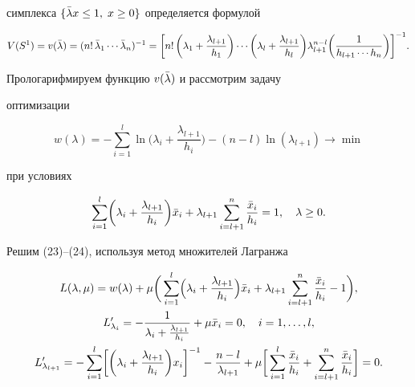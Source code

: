 симплекса $\{\Bar\lambda x\le 1,\;x\ge 0\}$ определяется формулой


$$


V(S^1)=v(\Bar \lambda)=(n!\,\Bar\lambda_1\dotsb


\Bar\lambda_n)^{-1}=\biggl[n!\,\biggl(\lambda_1+


\frac{\lambda_{l+1}}{h_1}\biggr)\dotsb\biggl(\lambda_l+


\frac{\lambda_{l+1}}{h_l}\biggr)\lambda^{n-l}_{l+1}


\biggl(\frac{1}{h_{l+1}\dotsb h_n}\biggr)\biggr]^{-1}.


$$


Прологарифмируем функцию $v(\Bar \lambda)$ и рассмотрим задачу


оптимизации


\begin{equation}


w(\lambda)=-\sum^l_{i=1}\ln\biggl(\lambda_i+


\frac{\lambda_{l+1}}{h_i}\biggr)-(n-l)\ln(\lambda_{l+1})\to\min


\end{equation}


при условиях


\begin{equation}


\sum^l_{i=1}\biggl(\lambda_i+\frac{\lambda_{l+1}}{h_i}\biggr)


\Bar x_i+\lambda_{l+1}\sum^n_{i=l+1}


\frac{\Bar x_i}{h_i}=1,\quad \lambda\ge 0.


\end{equation}


Решим (23)--(24), используя метод множителей Лагранжа


\begin{gather*}


L(\lambda,\mu)=w(\lambda)+\mu\biggl(\,\sum^l_{i=1}


\Bigl(\lambda_i+\frac{\lambda_{l+1}}{h_i}\Bigr)\Bar x_i+


\lambda_{l+1}\sum^n_{i=l+1}\frac{\Bar x_i}{h_i}-1\biggr),\\


L'_{\lambda_i}=-\frac{1}{\lambda_i+\frac{\lambda_{l+1}}{h_i}}+


\mu\Bar x_i=0,\quad i=1,\dotsc,l,\\


L'_{\lambda_{l+1}}=-\sum^l_{i=1}\biggl[\biggl(\lambda_i+


\frac{\lambda_{l+1}}{h_i}\biggr)x_i\biggr]^{-1}-


\frac{n-l}{\lambda_{l+1}}+\mu\biggl[\,\sum^l_{i=1}


\frac{\Bar x_i}{h_i}+\sum^n_{i=l+1}\frac{\Bar x_i}{h_i}\biggr]=0.


\end{gather*}


